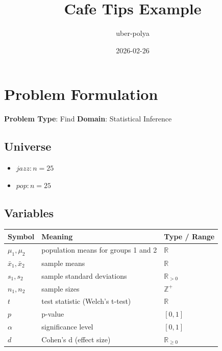 \documentclass[11pt, a4paper]{article}
\title{Cafe Tips Example}
\author{uber-polya}
\date{2026-02-26}
\begin{document}
\maketitle
\tableofcontents
\newpage

\section{Problem Formulation}

\begin{polyamodel}

\textbf{Problem Type}: Find \hfill
\textbf{Domain}: Statistical Inference


\end{polyamodel}

\subsection{Universe}

\begin{itemize}
  \item $jazz: n = 25$
  \item $pop: n = 25$
\end{itemize}

\subsection{Variables}

\begin{longtable}{lll}
\toprule
\textbf{Symbol} & \textbf{Meaning} & \textbf{Type / Range} \\
\midrule
\endhead
$\mu_1, \mu_2$ & population means for groups 1 and 2 & $\mathbb{{R}}$ \\
$\bar{{x}}_1, \bar{{x}}_2$ & sample means & $\mathbb{{R}}$ \\
$s_1, s_2$ & sample standard deviations & $\mathbb{{R}}_{{>0}}$ \\
$n_1, n_2$ & sample sizes & $\mathbb{{Z}}^+$ \\
$t$ & test statistic (Welch's t-test) & $\mathbb{{R}}$ \\
$p$ & p-value & $[0, 1]$ \\
$\alpha$ & significance level & $[0, 1]$ \\
$d$ & Cohen's d (effect size) & $\mathbb{{R}}_{\ge 0}$ \\
\bottomrule
\end{longtable}
\end{document}
